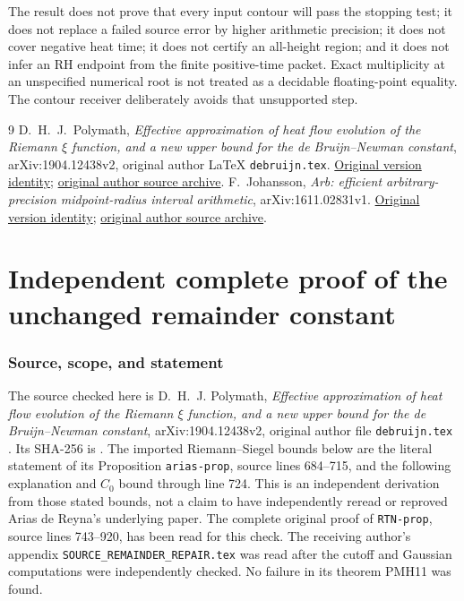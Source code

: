 \documentclass[11pt]{article}
\begin{document}
The result does not prove that every input contour will pass the
stopping test; it does not replace a failed source error by higher
arithmetic precision; it does not cover negative heat time; it
does not certify an all-height region; and it does not infer an RH
endpoint from the finite positive-time packet. Exact multiplicity
at an unspecified numerical root is not treated as a decidable
floating-point equality. The contour receiver deliberately avoids
that unsupported step.

\begin{thebibliography}{9}
D.~H.~J.~Polymath,
\emph{Effective approximation of heat flow evolution of the Riemann
$\xi$ function, and a new upper bound for the de Bruijn--Newman
constant}, arXiv:1904.12438v2, original author LaTeX
\texttt{debruijn.tex}.
\href{https://arxiv.org/abs/1904.12438v2}{Original version identity};
\href{https://arxiv.org/src/1904.12438v2}{original author source archive}.
F.~Johansson, \emph{Arb: efficient arbitrary-precision
midpoint-radius interval arithmetic}, arXiv:1611.02831v1.
\href{https://arxiv.org/abs/1611.02831v1}{Original version identity};
\href{https://arxiv.org/src/1611.02831v1}{original author source archive}.
\end{thebibliography}

\endgroup

\clearpage\begingroup
\part*{Independent complete proof of the unchanged remainder constant}
\newcommand{\pmindependentR}{\mathbb R}
\newcommand{\pmindependentC}{\mathbb C}
\newcommand{\pmindependentdd}{\,\mathrm d}
\newtheorem{pmindependenttheorem}{Theorem}



\section{Source, scope, and statement}

The source checked here is D.~H.~J. Polymath,
\emph{Effective approximation of heat flow evolution of the Riemann
$\xi$ function, and a new upper bound for the de Bruijn--Newman
constant}, arXiv:1904.12438v2, original author file
\texttt{debruijn.tex} \cite{pmindependent:polymath}. Its SHA-256 is
.
The imported Riemann--Siegel bounds below are the literal statement
of its Proposition \texttt{arias-prop}, source lines 684--715,
and the following explanation and $C_0$ bound through line 724.
This is an independent derivation from those stated bounds, not
a claim to have independently reread or reproved Arias de Reyna's
underlying paper. The complete original proof of
\texttt{RTN-prop}, source lines 743--920, has been read for this check.
The receiving author's appendix \texttt{SOURCE\_REMAINDER\_REPAIR.tex}
was read after the cutoff and Gaussian computations were independently
checked. No failure in its theorem PMH11 was found.
\end{document}
